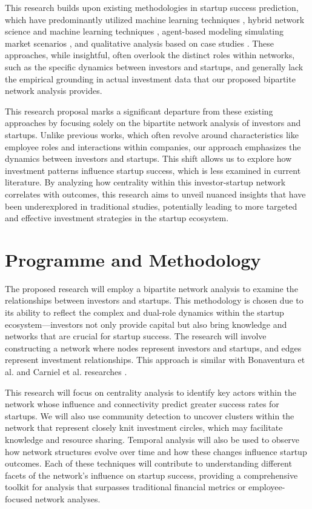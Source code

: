\documentclass[a4paper,11pt]{article}
\begin{document}
This research builds upon existing methodologies in startup success prediction, which have predominantly utilized machine learning techniques \cite{krishna2016a} \cite{sharchilev2018a}, hybrid network science and machine learning techniques \cite{carniel2023a} \cite{yang2020a}, agent-based modeling simulating market scenarios \cite{lengyel2020a}, and qualitative analysis based on case studies \cite{mccarthy2023a}. These approaches, while insightful, often overlook the distinct roles within networks, such as the specific dynamics between investors and startups, and generally lack the empirical grounding in actual investment data that our proposed bipartite network analysis provides.

This research proposal marks a significant departure from these existing approaches by focusing solely on the bipartite network analysis of investors and startups. Unlike previous works, which often revolve around characteristics like employee roles and interactions within companies, our approach emphasizes the dynamics between investors and startups. This shift allows us to explore how investment patterns influence startup success, which is less examined in current literature. By analyzing how centrality within this investor-startup network correlates with outcomes, this research aims to unveil nuanced insights that have been underexplored in traditional studies, potentially leading to more targeted and effective investment strategies in the startup ecosystem.

\section{Programme and Methodology}
The proposed research will employ a bipartite network analysis to examine the relationships between investors and startups. This methodology is chosen due to its ability to reflect the complex and dual-role dynamics within the startup ecosystem—investors not only provide capital but also bring knowledge and networks that are crucial for startup success. The research will involve constructing a network where nodes represent investors and startups, and edges represent investment relationships. This approach is similar with Bonaventura et al. \cite{bonaventura2020a} and Carniel et al. researches \cite{carniel2023a}.

This research will focus on centrality analysis to identify key actors within the network whose influence and connectivity predict greater success rates for startups. We will also use community detection to uncover clusters within the network that represent closely knit investment circles, which may facilitate knowledge and resource sharing. Temporal analysis will also be used to observe how network structures evolve over time and how these changes influence startup outcomes. Each of these techniques will contribute to understanding different facets of the network's influence on startup success, providing a comprehensive toolkit for analysis that surpasses traditional financial metrics or employee-focused network analyses.
\end{document}
